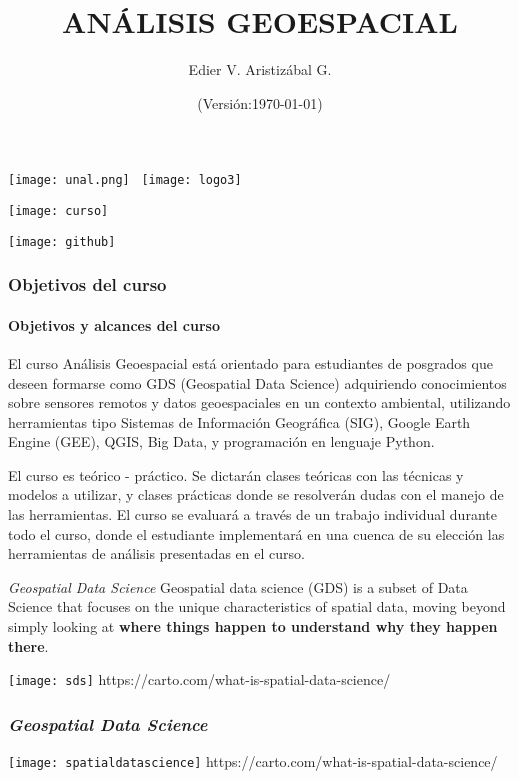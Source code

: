 \documentclass[12pt]{beamer}
\title[Introducción]{ANÁLISIS GEOESPACIAL}
\author[Edier Aristizábal]{Edier V. Aristizábal G.}
\institute{\emph{evaristizabalg@unal.edu.co}}
\date{(Versión:\today)}
\begin{document}
\begin{frame}
\titlepage
\centering
	\texttt{[image: unal.png]}\hspace*{4.75cm}~%
   	\texttt{[image: logo3]} 
\end{frame}
\begin{frame}
\centering
	\texttt{[image: curso]}
\end{frame}
 \begin{frame}
\centering
	\texttt{[image: github]}
\end{frame}
\begin{frame}
\frametitle{Objetivos del curso}
\framesubtitle{Objetivos y alcances del curso}
\justifying
El curso \alert{Análisis Geoespacial} está orientado para estudiantes de posgrados que deseen formarse como GDS (Geospatial Data Science) adquiriendo conocimientos sobre sensores remotos y datos geoespaciales en un contexto ambiental, utilizando herramientas tipo Sistemas de Información Geográfica (SIG), Google Earth Engine (GEE), QGIS, Big Data, y programación en lenguaje Python.\vfill

El curso es teórico - práctico. Se dictarán clases teóricas con las técnicas y modelos a utilizar, y clases prácticas donde se resolverán dudas con el manejo de las herramientas. El curso se evaluará a través de un trabajo individual durante todo el curso, donde el estudiante implementará en una cuenca de su elección las herramientas de análisis presentadas en el curso.
\end{frame}
\begin{frame}
\begin{block}{\emph{Geospatial Data Science}}
\justifying
\small{Geospatial data science (GDS) is a subset of Data Science that focuses on the unique characteristics of spatial data, moving beyond simply looking at \textbf{where things happen to understand why they happen there}}.
\end{block}
\centering
	\texttt{[image: sds]}\vfill
\tiny{https://carto.com/what-is-spatial-data-science/}
\end{frame}
\begin{frame}
\frametitle{\emph{Geospatial Data Science}}
\centering
	\texttt{[image: spatialdatascience]}\vfill
	\tiny{https://carto.com/what-is-spatial-data-science/}
\end{frame}
\end{document}
